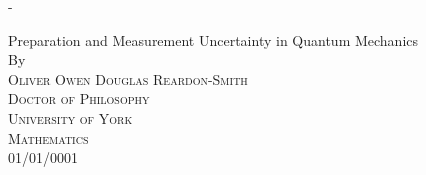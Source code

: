 
\begin{titlingpage}
\begin{SingleSpace}
\calccentering{\unitlength} 
\begin{adjustwidth*}{\unitlength}{-\unitlength}
\vspace*{13mm}
\begin{center}
{\HUGE Preparation and Measurement Uncertainty in Quantum Mechanics}\\[4mm]
\vspace{31mm}
{\large By}\\
\vspace{9mm}
{\large\textsc{Oliver Owen Douglas Reardon-Smith}}\\
\vspace{31mm}
{\large
\textsc{Doctor of Philosophy}}\\
\vspace{21mm}
{\large
\textsc{University of York}\\
\textsc{Mathematics}
}\\
\vspace{21mm}
\vspace{9mm}
{\large\textsc{01/01/0001}}
\vspace{12mm}
\end{center}
\end{adjustwidth*}
\end{SingleSpace}
\end{titlingpage}